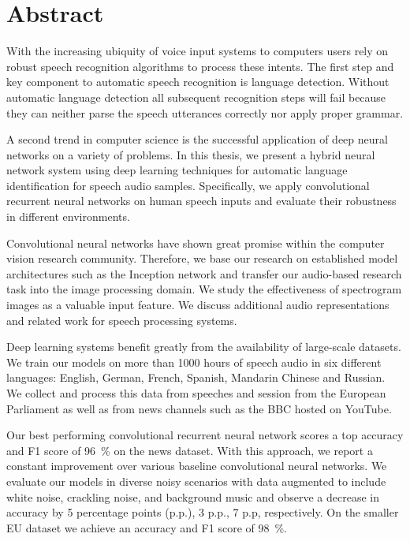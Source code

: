 \section*{\LARGE Abstract}
With the increasing ubiquity of voice input systems to computers users rely on robust speech recognition algorithms to process these intents. The first step and key component to automatic speech recognition is language detection. Without automatic language detection all subsequent recognition steps will fail because they can neither parse the speech utterances correctly nor apply proper grammar.

A second trend in computer science is the successful application of deep neural networks on a variety of problems. In this thesis, we present a hybrid neural network system using deep learning techniques for automatic language identification for speech audio samples. Specifically, we apply convolutional recurrent neural networks on human speech inputs and evaluate their robustness in different environments.

Convolutional neural networks have shown great promise within the computer vision research community. Therefore, we base our research on established model architectures such as the Inception network\cite{szegedy2015going} and transfer our audio-based research task into the image processing domain. We study the effectiveness of spectrogram images as a valuable input feature. We discuss additional audio representations and related work for speech processing systems.

Deep learning systems benefit greatly from the availability of large-scale datasets. We train our models on more than \num{1000} hours of speech audio in six different languages: English, German, French, Spanish, Mandarin Chinese and Russian. We collect and process this data from speeches and session from the European Parliament as well as from news channels such as the BBC hosted on YouTube.

Our best performing convolutional recurrent neural network scores a top accuracy and F1 score of \SI{96}{\percent} on the news dataset. With this approach, we report a constant improvement over various baseline convolutional neural networks. We evaluate our models in diverse noisy scenarios with data augmented to include white noise, crackling noise, and background music and observe a decrease in accuracy by 5 percentage points (p.p.), 3 p.p., 7 p.p, respectively. On the smaller EU dataset we achieve an accuracy and F1 score of \SI{98}{\percent}.
